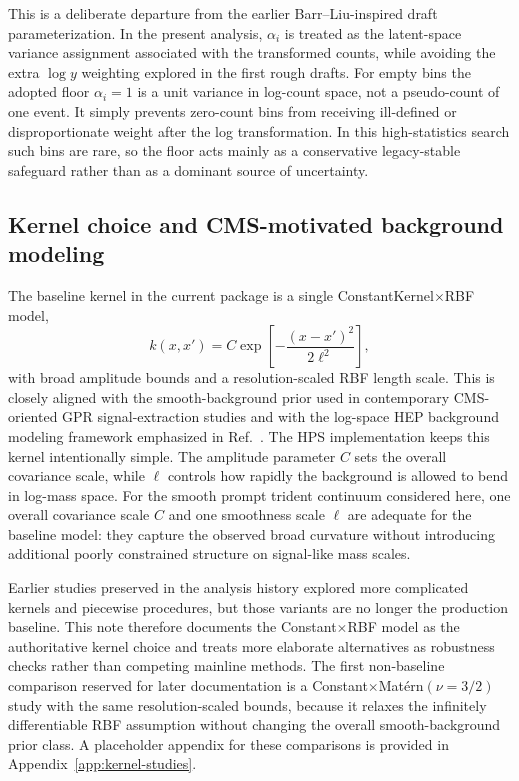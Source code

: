 This is a deliberate departure from the earlier Barr--Liu-inspired draft
parameterization. In the present analysis, $\alpha_i$ is treated as the latent-space
variance assignment associated with the transformed counts, while avoiding the extra
$\log y$ weighting explored in the first rough drafts. For empty bins the adopted floor
$\alpha_i=1$ is a unit variance in log-count space, not a pseudo-count of one event. It
simply prevents zero-count bins from receiving ill-defined or disproportionate weight
after the log transformation. In this high-statistics search such bins are rare, so the
floor acts mainly as a conservative legacy-stable safeguard rather than as a dominant
source of uncertainty.

\subsection{Kernel choice and CMS-motivated background modeling}
\label{sec:kernel-choice}

The baseline kernel in the current package is a single
ConstantKernel$\times$RBF model,
\begin{equation}
k(x,x') = C \exp\!\left[-\frac{(x-x')^2}{2\ell^2}\right],
\end{equation}
with broad amplitude bounds and a resolution-scaled RBF length scale. This is closely
aligned with the smooth-background prior used in contemporary CMS-oriented GPR
signal-extraction studies \cite{Gandrakota2023} and with the log-space HEP background
modeling framework emphasized in Ref.~\cite{BarrLiu2025}. The HPS implementation keeps
this kernel intentionally simple. The amplitude parameter $C$ sets the overall
covariance scale, while $\ell$ controls how rapidly the background is allowed to bend
in log-mass space. For the smooth prompt trident continuum considered here, one overall
covariance scale $C$ and one smoothness scale $\ell$ are adequate for the baseline
model: they capture the observed broad curvature without introducing additional poorly
constrained structure on signal-like mass scales.

Earlier studies preserved in the analysis history explored more complicated kernels and
piecewise procedures, but those variants are no longer the production baseline. This
note therefore documents the Constant$\times$RBF model as the authoritative kernel
choice and treats more elaborate alternatives as robustness checks rather than
competing mainline methods. The first non-baseline comparison reserved for later
documentation is a Constant$\times$Mat\'ern$(\nu=3/2)$ study with the same
resolution-scaled bounds, because it relaxes the infinitely differentiable RBF
assumption without changing the overall smooth-background prior class. A placeholder
appendix for these comparisons is provided in Appendix~\ref{app:kernel-studies}.

